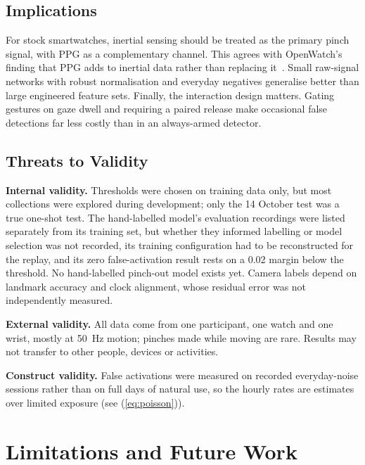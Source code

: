 \subsection{Implications}

For stock smartwatches, inertial sensing should be treated as the primary pinch signal, with PPG as a complementary channel. This agrees with OpenWatch's finding that PPG adds to inertial data rather than replacing it~\cite{bonazzi2026openwatch}. Small raw-signal networks with robust normalisation and everyday negatives generalise better than large engineered feature sets. Finally, the interaction design matters. Gating gestures on gaze dwell and requiring a paired release make occasional false detections far less costly than in an always-armed detector.

\subsection{Threats to Validity}

\textbf{Internal validity.} Thresholds were chosen on training data only, but most collections were explored during development; only the 14 October test was a true one-shot test. The hand-labelled model's evaluation recordings were listed separately from its training set, but whether they informed labelling or model selection was not recorded, its training configuration had to be reconstructed for the replay, and its zero false-activation result rests on a 0.02 margin below the threshold. No hand-labelled pinch-out model exists yet. Camera labels depend on landmark accuracy and clock alignment, whose residual error was not independently measured.

\textbf{External validity.} All data come from one participant, one watch and one wrist, mostly at 50~Hz motion; pinches made while moving are rare. Results may not transfer to other people, devices or activities.

\textbf{Construct validity.} False activations were measured on recorded everyday-noise sessions rather than on full days of natural use, so the hourly rates are estimates over limited exposure (see (\ref{eq:poisson})).

\section{Limitations and Future Work}\label{sec:future}

